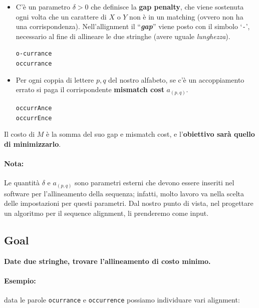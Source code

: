 \begin{itemize}
	\item
	      C'è un parametro $\delta>0$ che definisce la \textbf{gap penalty},
	      che viene sostenuta ogni volta che un carattere di $X$ o $Y$ non è
	      in un matching (ovvero non ha una corrispondenza). Nell'allignment il
	      ``\textbf{\emph{gap}}'' viene posto con il simbolo `\texttt{-}',
	      necessario al fine di allineare le due stringhe (avere uguale
	      \emph{lunghezza}).
	      \begin{center}
		      \texttt{o-currance}\\
		      \texttt{occurrance}
	      \end{center}
	\item
	      Per ogni coppia di lettere $p,q$ del nostro alfabeto, se c'è un
	      accoppiamento errato si paga il corrispondente \textbf{mismatch cost}
	      $a_{(p,q)}$.
	      \begin{center}
		      \texttt{occurrAnce}\\
		      \texttt{occurrEnce}
	      \end{center}
\end{itemize}


Il costo di $M$ è la somma del suo gap e mismatch cost, e
l'\textbf{obiettivo sarà quello di minimizzarlo}.

\paragraph*{Nota:} Le quantità $\delta$ e $a_{(p,q)}$ sono parametri
esterni che devono essere inseriti nel software per l'allineamento della
sequenza; infatti, molto lavoro va nella scelta delle impostazioni per
questi parametri. Dal nostro punto di vista, nel progettare un algoritmo
per il sequence alignment, li prenderemo come input.

\subsection{Goal}
\begin{myblockquote}
	\textbf{Date due stringhe, trovare l'allineamento di costo minimo.}
\end{myblockquote}

\paragraph*{Esempio:} data le parole \texttt{ocurrance} e
\texttt{occurrence} possiamo individuare vari alignment:

